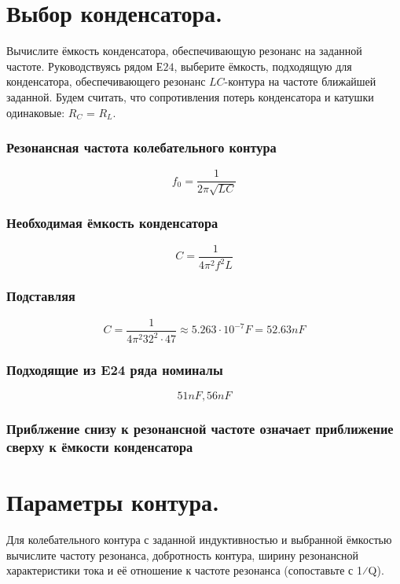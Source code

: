 \documentclass[12pt,a4paper]{article}
\begin{document}
	\newpage
	\section{Выбор конденсатора.}
	Вычислите ёмкость конденсатора, обеспечивающую резонанс на заданной частоте. Руководствуясь рядом $Е24$, выберите ёмкость, подходящую для конденсатора, обеспечивающего резонанс $LC$-контура на частоте ближайшей заданной. Будем считать, что сопротивления потерь конденсатора и катушки одинаковые: $R_C$ = $R_L$.
	
	\subsubsection*{Резонансная частота колебательного контура}
	
		\[f_0 = \frac{1}{2\pi\sqrt{LC}}\]
	
	\subsubsection*{Необходимая ёмкость конденсатора}
	
		\[C = \frac{1}{4\pi^2 f^2 L}\]
		
	\subsubsection*{Подставляя}
	
		\[C = \frac{1}{4\pi^2 32^2 \cdot 47} \approx 5.263 \cdot 10^{-7} F = 52.63 n F\]
	
	\subsubsection*{Подходящие из E24 ряда номиналы}
		
		\[51 nF, 56 nF\]
		
	\subsubsection*{Приблжение снизу к резонансной частоте означает приближение сверху к ёмкости конденсатора}
	
	\newpage
	
	\section{Параметры контура.}
	Для колебательного контура с заданной индуктивностью и выбранной ёмкостью вычислите частоту резонанса, добротность контура, ширину резонансной
	характеристики тока и её отношение к частоте резонанса (сопоставьте с 1⁄Q).
	
\end{document}
